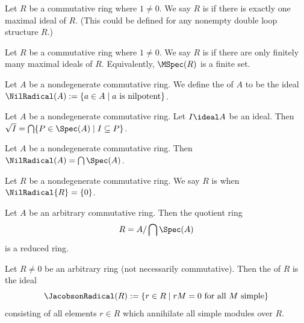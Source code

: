 \begin{definition}
Let $R$ be a commutative ring where $1\neq0$.
We say $R$ is  if there is exactly one maximal ideal of $R$.
(This could be defined for any nonempty double loop structure $R$.)
\end{definition}

\begin{definition}
Let $R$ be a commutative ring where $1\neq0$.
We say $R$ is  if there are only finitely many
maximal ideals of $R$. Equivalently, $\MSpec(R)$ is a finite set.
\end{definition}

\begin{definition}
Let $A$ be a nondegenerate commutative ring.
We define the  of $A$ to be the ideal
$\NilRadical(A):=\{a\in A\mid a\mbox{ is nilpotent}\}$. 
\end{definition}

\begin{theorem}
Let $A$ be a nondegenerate commutative ring.
Let $I\ideal A$ be an ideal.
Then $\Radical{I}=\Intersects\{P\in\Spec(A)\mid I\subset P\}$.
\end{theorem}

\begin{theorem}
Let $A$ be a nondegenerate commutative ring.
Then $\NilRadical(A)=\Intersects\Spec(A)$.
\end{theorem}

\begin{definition}
Let $R$ be a nondegenerate commutative ring.
We say $R$ is  when $\NilRadical{R}=\{0\}$.
\end{definition}

\begin{theorem}
Let $A$ be an arbitrary commutative ring. Then the quotient ring
\begin{equation*}
R = A/\bigcap\Spec(A)
\end{equation*}
is a reduced ring.
\end{theorem}

\begin{definition}
Let $R\neq0$ be an arbitrary ring (not necessarily commutative).
Then the  of $R$ is the ideal
\begin{equation}
\JacobsonRadical(R):=\{r\in R\mid rM=0\mbox{ for all }M\mbox{ simple}\}
\end{equation}
consisting of all elements $r\in R$ which annihilate all simple
modules over $R$.
\end{definition}

